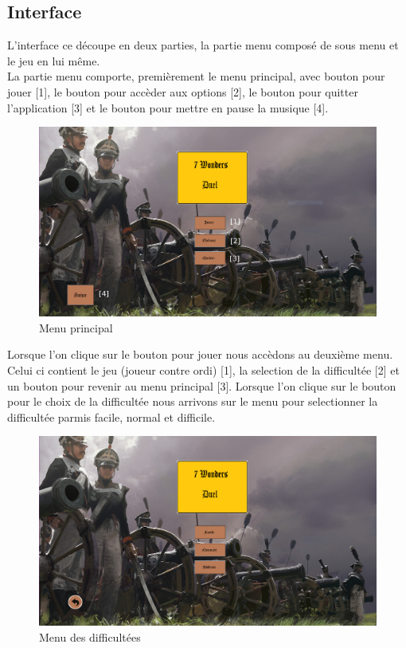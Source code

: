 \documentclass[12pt]{article}
\begin{document}
	\subsection{Interface}
	    L'interface ce découpe en deux parties, la partie menu composé de sous menu et le jeu en lui même. \\
	    La partie menu comporte, premièrement le menu principal, avec bouton pour jouer [1], le bouton pour accèder aux options [2], le bouton pour quitter l'application [3] et le bouton pour mettre en pause la musique [4].
	    \begin{figure}[htbp]
            \centering
            \includegraphics[width=.8\linewidth]{images/menu_principal.PNG}
            \caption{Menu principal}
        \end{figure}
        \newpage
	    Lorsque l'on clique sur le bouton pour jouer nous accèdons au deuxième menu. Celui ci contient le jeu (joueur contre ordi) [1], la selection de la difficultée [2] et un bouton pour revenir au menu principal [3]. 
	    Lorsque l'on clique sur le bouton pour le choix de la difficultée nous arrivons sur le menu pour selectionner la difficultée parmis facile, normal et difficile. 
	    \begin{figure}[htbp]
            \centering
            \includegraphics[width=.8\linewidth]{images/menu_difficultees.PNG}
            \caption{Menu des difficultées}
        \end{figure}
\end{document}
